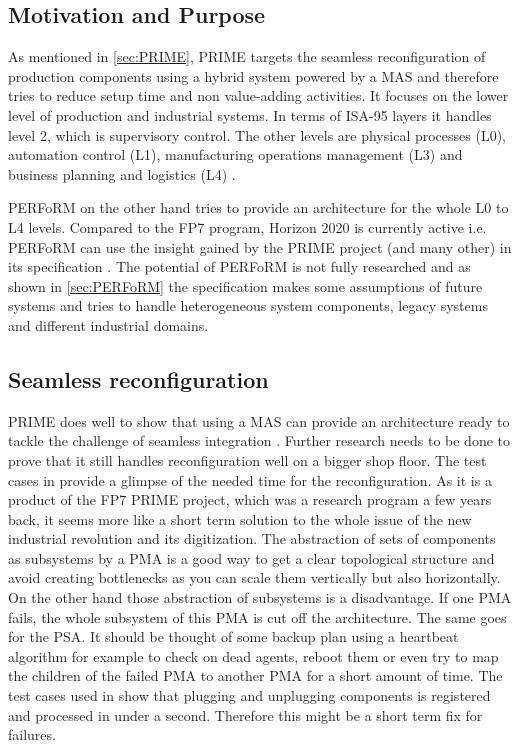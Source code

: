 \documentclass[conference,compsoc,hidelinks]{IEEEtran}
\begin{document}
\subsection{Motivation and Purpose}
As mentioned in \autoref{sec:PRIME}, PRIME targets the seamless reconfiguration of production components using a hybrid system powered by a MAS and therefore tries to reduce setup time and non value-adding activities. It focuses on the lower level of production and industrial systems. In terms of ISA-95 layers it handles level 2, which is supervisory control. The other levels are physical processes (L0), automation control (L1), manufacturing operations management (L3) and business planning and logistics (L4)  \cite{SpecPERFoRM}.

PERFoRM on the other hand tries to provide an architecture for the whole L0 to L4 levels. Compared  to the FP7 program, Horizon 2020 is currently active i.e. PERFoRM can use the insight gained by the PRIME project (and many other) in its specification \cite{SpecPERFoRM}. The potential of PERFoRM is not fully researched and as shown in \autoref{sec:PERFoRM} the specification makes some assumptions of future systems and tries to handle heterogeneous system components, legacy systems and different industrial domains.

\subsection{Seamless reconfiguration}
PRIME does well to show that using a MAS can provide an architecture ready to tackle the challenge of seamless integration \cite{Hybrid}. Further research needs to be done to prove that it still handles reconfiguration well on a bigger shop floor. The test cases in \cite{Hybrid} provide a glimpse of the needed time for the reconfiguration. As it is a product of the FP7 PRIME project, which was a research program a few years back, it seems more like a short term solution to the whole issue of the new industrial revolution and its digitization. The abstraction of sets of components as subsystems by a PMA is a good way to get a clear topological structure and avoid creating bottlenecks as you can scale them vertically but also horizontally. On the other hand those abstraction of subsystems is a disadvantage. If one PMA fails, the whole subsystem of this PMA is cut off the architecture. The same goes for the PSA. It should be thought of some backup plan using a heartbeat algorithm for example to check on dead agents, reboot them or even try to map the children of the failed PMA to another PMA for a short amount of time. The test cases used in \cite{Hybrid} show that plugging and unplugging components is registered and processed in under a second. Therefore this might be a short term fix for failures.
\end{document}
